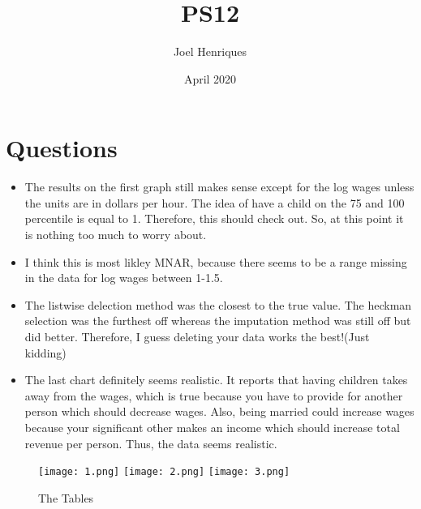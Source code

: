 \documentclass{article}
\title{PS12}
\author{Joel Henriques}
\date{April 2020}
\begin{document}
\maketitle

\section{Questions}
\begin{itemize}
    \item  The results on the first graph still makes sense except for the log wages unless the units are in dollars per hour. The idea of have a child on the 75 and 100 percentile is equal to 1. Therefore, this should check out. So, at this point it is nothing too much to worry about. 
    \item I think this is most likley MNAR, because there seems to be a range missing in the data for log wages between 1-1.5. 
    \item The listwise delection method was the closest to the true value. The heckman selection was the furthest off whereas the imputation method was still off but did better. Therefore, I guess deleting your data works the best!(Just kidding)
    \item The last chart definitely seems realistic. It reports that having children takes away from the wages, which is true because you have to provide for another person which should decrease wages. Also, being married could increase wages because your significant other makes an income which should increase total revenue per person. Thus, the data seems realistic. 
\end{itemize}
\begin{figure}[h!]
\centering
\texttt{[image: 1.png]}
\texttt{[image: 2.png]}
\texttt{[image: 3.png]}
\caption{The Tables}
\label{fig:universe}
\end{figure}
\end{document}

